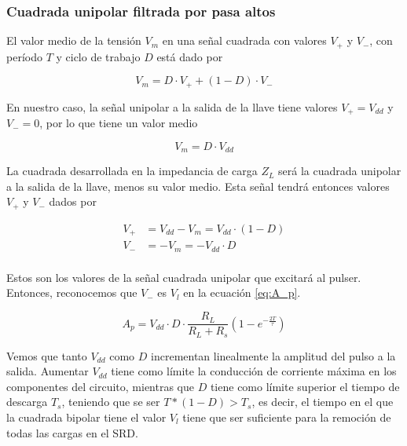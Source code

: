 \subsubsection{Cuadrada unipolar filtrada por pasa altos}

El valor medio de la tensión $V_m$ en una señal cuadrada con valores $V_+$ y
$V_-$, con período $T$ y ciclo de trabajo $D$ está dado por

\begin{equation}
    V_m = D \cdot V_+ + (1-D) \cdot V_-
\end{equation}

En nuestro caso, la señal unipolar a la salida de la llave tiene valores
$V_+=V_{dd}$ y $V_-=0$, por lo que tiene un valor medio

\begin{equation}
    V_m = D \cdot V_{dd}
\end{equation}

La cuadrada desarrollada en la impedancia de carga $Z_L$ será la cuadrada
unipolar a la salida de la llave, menos su valor medio. Esta señal tendrá
entonces valores $V_+$ y $V_-$ dados por

\begin{equation}
    \label{eq:square_linear_load_highpassed_values}
    \begin{aligned}
        V_+ &= V_{dd}-V_m = V_{dd} \cdot (1-D) \\
        V_- &= -V_m = -V_{dd} \cdot D \\
    \end{aligned}
\end{equation}

Estos son los valores de la señal cuadrada unipolar que excitará al pulser.
Entonces, reconocemos que $V_-$ es $V_l$ en la ecuación \ref{eq:A_p}.

\begin{equation}
    A_p = V_{dd} \cdot D \cdot \frac{R_L}{R_L+R_s} \left( 1-e^{-\frac{2T}{\tau}}\right)
\end{equation}

Vemos que tanto $V_{dd}$ como $D$ incrementan linealmente la amplitud del pulso
a la salida. Aumentar $V_{dd}$ tiene como límite la conducción de corriente
máxima en los componentes del circuito, mientras que $D$ tiene como límite
superior el tiempo de descarga $T_s$, teniendo que se ser $T*(1-D) > T_s$, es
decir, el tiempo en el que la cuadrada bipolar tiene el valor $V_l$ tiene que
ser suficiente para la remoción de todas las cargas en el SRD.

